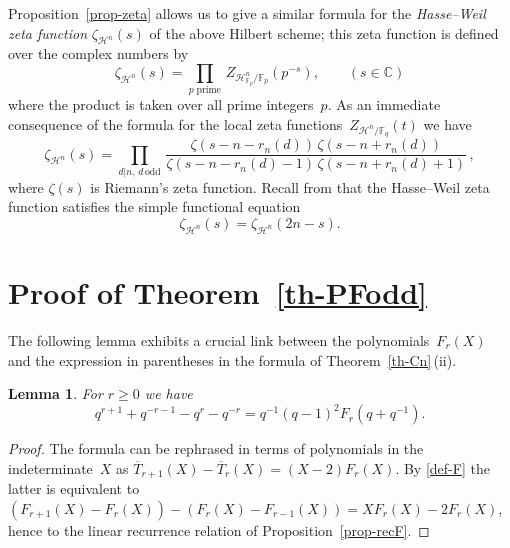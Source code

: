 \documentclass[11pt, a4paper]{amsart}
\newtheorem{lemma}[theorem]{Lemma}
\theoremstyle{definition}
\newcommand\HH{\mathcal H}
\newcommand\CC{\mathbb{C}}
\newcommand\FF{\mathbb{F}}
\newcommand\TT{\overline{T}}
\numberwithin{equation}{section}
\begin{document}
Proposition~\ref{prop-zeta} allows us to give a similar formula for the \emph{Hasse--Weil zeta function} 
$\zeta_{\HH^n}(s)$ of the above Hilbert scheme; this zeta function is defined over the complex numbers by
\begin{equation*}\label{def-HWZ}
\zeta_{\HH^n}(s) = \prod_{p \; \text{prime}} \, Z_{{\HH^n_{\FF_p}}/\FF_p}(p^{-s}), \qquad (s \in \CC)
\end{equation*}
where the product is taken over all prime integers~$p$. 
As an immediate consequence of the formula for the local zeta functions~$Z_{\HH^n/\FF_q}(t)$ we have
\begin{equation}
\zeta_{\HH^n}(s) = \prod_{d | n , \, d \, \mathrm{odd}} \, 
\frac{ \zeta(s - n - r_n(d)) \, \zeta(s - n + r_n(d) ) }{ \zeta(s - n - r_n(d) -1) \, \zeta(s - n + r_n(d) +1) } \, , 
\end{equation}
where $\zeta(s)$ is Riemann's zeta function.
Recall from \cite[Sect.~2]{KR3} that the Hasse--Weil zeta function satisfies the simple functional equation
\begin{equation}
\zeta_{\HH^n}(s) = \zeta_{\HH^n}(2n-s).
\end{equation}

\section{Proof of Theorem~\ref{th-PFodd}}\label{pf-th-PFodd}

The following lemma exhibits a crucial link between the polynomials~$F_r(X)$ and
the expression in parentheses in the formula of Theorem~\ref{th-Cn}\,(ii).

\begin{lemma}\label{lem-CF}
For $r \geq 0$ we have
\[
q^{r+1} + q^{-r-1} - q^{r} - q^{-r}  = q^{-1}(q-1)^2 F_r(q + q^{-1}) .
\]
\end{lemma}

\begin{proof}
The formula can be rephrased in terms of polynomials in the indeterminate~$X$
as $\TT_{r+1}(X) - \TT_r(X) = (X-2) F_r(X)$. 
By \eqref{def-F} the latter is equivalent to $(F_{r+1}(X) - F_r(X)) - (F_r(X) - F_{r-1}(X)) = X F_r(X) - 2 F_r(X)$,
hence to the linear recurrence relation of Proposition~\ref{prop-recF}.
\end{proof}
\end{document}
